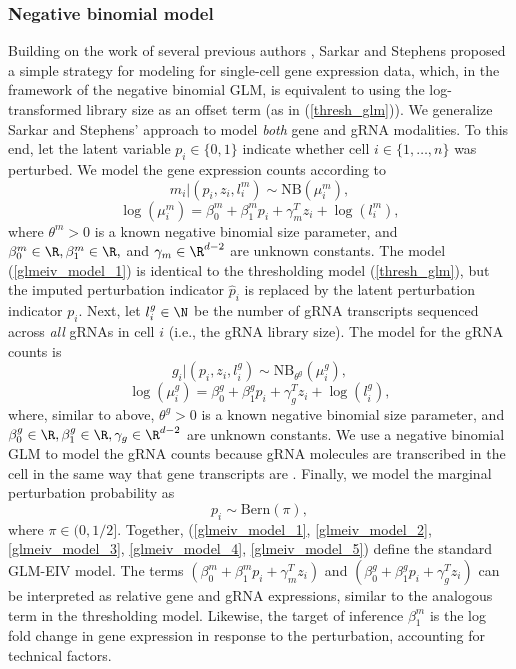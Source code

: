 \documentclass[12pt]{article}
\begin{document}
\subsubsection*{Negative binomial model}
Building on the work of several previous authors \cite{Townes2019,Svensson2020,Hafemeister2019}, Sarkar and Stephens \cite{Sarkar2021} proposed a simple strategy for modeling for single-cell gene expression data, which, in the framework of the negative binomial GLM, is equivalent to using the log-transformed library size as an offset term (as in (\ref{thresh_glm})). We generalize Sarkar and Stephens' approach to model \textit{both} gene and gRNA modalities. To this end, let the latent variable $p_i \in \{0,1\}$ indicate whether cell $i \in \{1, \dots, n\}$ was perturbed. We model the gene expression counts according to
\begin{equation}\label{glmeiv_model_1}
m_i |(p_i, z_i, l^m_i) \sim \textrm{NB}(\mu_i^m),
\end{equation}
\begin{equation}\label{glmeiv_model_2}
\log(\mu^m_i) = \beta^m_0 + \beta^m_1 p_i + \gamma_m^T z_i + \log(l^m_i),
\end{equation}
where $\theta^m > 0$ is a known negative binomial size parameter, and $\beta^m_0 \in \R, \beta^m_1 \in \R,$ and $\gamma_m \in \R^{d - 2}$ are unknown constants. The model (\ref{glmeiv_model_1}) is identical to the thresholding model (\ref{thresh_glm}), but the imputed perturbation indicator $\hat{p}_i$ is replaced by the latent perturbation indicator $p_i$. Next, let $l^g_i \in \N$ be the number of gRNA transcripts sequenced across \textit{all} gRNAs in cell $i$ (i.e., the gRNA library size). The model for the gRNA counts is 
\begin{equation}\label{glmeiv_model_3}
g_i | (p_i, z_i, l^g_i) \sim \textrm{NB}_{\theta^g}\left(\mu_i^g\right),
\end{equation}
\begin{equation}\label{glmeiv_model_4}
\log(\mu_i^g) = \beta^g_0 + \beta^g_1p_i + \gamma^T_g z_i + \log(l^g_i),
\end{equation}
where, similar to above, $\theta^g > 0$ is a known negative binomial size parameter, and $\beta^g_0 \in \R, \beta^g_1 \in \R, \gamma_g \in \R^{d - 2}$ are unknown constants. We use a negative binomial GLM to model the gRNA counts because gRNA molecules are transcribed in the cell in the same way that gene transcripts are \cite{Datlinger2017,Hill2018}. Finally, we model the marginal perturbation probability as
\begin{equation}\label{glmeiv_model_5}
p_i \sim \textrm{Bern}(\pi),
\end{equation} where $\pi \in (0,1/2]$. 
 Together, (\ref{glmeiv_model_1}, \ref{glmeiv_model_2}, \ref{glmeiv_model_3}, \ref{glmeiv_model_4}, \ref{glmeiv_model_5}) define the standard GLM-EIV model. The terms $(\beta^m_0 + \beta^m_1p_i + \gamma^T_m z_i)$ and $(\beta^g_0 + \beta^g_1 p_i + \gamma^T_g z_i)$ can be interpreted as relative gene and gRNA expressions, similar to the analogous term in the thresholding model. Likewise, the target of inference $\beta^m_1$ is the log fold change in gene expression in response to the perturbation, accounting for technical factors.
 
\end{document}
